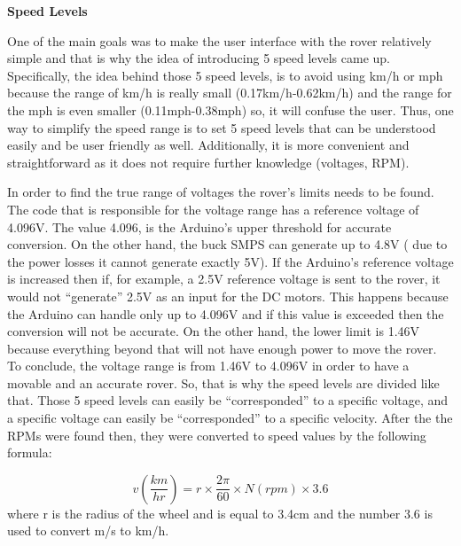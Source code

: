 \documentclass[a4paper]{article}
\begin{document}

\textbf{Speed Levels}

One of the main goals was to make the user interface with the rover relatively 
simple and that is why the idea of introducing 5 speed levels came up. 
Specifically, the idea behind those 5 speed levels, is to avoid using km/h or 
mph because the range of km/h is really small (0.17km/h-0.62km/h) and the range 
for the mph is even smaller (0.11mph-0.38mph) so, it will confuse the user. Thus,
one way to simplify the speed range is to set 5 speed levels that can be 
understood easily and be user friendly as well. Additionally, it is more 
convenient and straightforward as it does not require further knowledge 
(voltages, RPM).

In order to find the true range of voltages the rover's limits needs to be found. 
The code that is responsible for the voltage range has a reference voltage of 
4.096V. The value 4.096, is the Arduino's upper threshold for accurate 
conversion. On the other hand, the buck SMPS can generate up to 4.8V 
( due to the power losses it cannot generate exactly 5V). If the Arduino's 
reference voltage is increased then if, for example, a 2.5V reference voltage 
is sent to the rover, it  would not ``generate'' 2.5V as an input for the 
DC motors. This happens because the Arduino can handle only up to 4.096V and 
if this value is exceeded then the conversion will not be accurate. On the other 
hand, the lower limit is 1.46V because everything beyond that will not have enough 
power to move the rover. To conclude, the voltage range is from 1.46V to 4.096V in 
order to have a movable and an accurate rover. So, that is why the speed levels 
are divided like that. Those 5 speed levels can easily be ``corresponded'' to a 
specific voltage, and a specific voltage can easily be ``corresponded'' to a 
specific velocity.  After the the RPMs were found then, they were converted to 
speed values by the following formula:

$$ v \left(\frac{km}{hr}\right) = r \times \frac{2\pi}{60} \times N \left( rpm \right) \times 3.6  $$
where r is the radius of the wheel and is equal to 3.4cm and the number 3.6 is used to convert m/s to km/h. 



\end{document}
